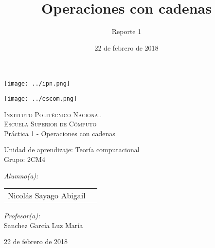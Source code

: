 \documentclass[12pt]{article}
\date{22 de febrero de 2018}
\title{Operaciones con cadenas}
\author{Reporte 1}
\begin{document}
		\begin{titlepage}
			\begin{center}
				
				
				\noindent
				\begin{minipage}{0.5\textwidth}
					\begin{flushleft} \large
						\texttt{[image: ../ipn.png]}
					\end{flushleft}
				\end{minipage}%
				\begin{minipage}{0.55\textwidth}
					\begin{flushright} \large
						\texttt{[image: ../escom.png]}
					\end{flushright}
				\end{minipage}
				
				\textsc{\LARGE Instituto Politécnico Nacional}\\[0.5cm]
				
				\textsc{\Large Escuela Superior de Cómputo}\\[1cm]
				
				
				{ \huge Práctica 1 - Operaciones con cadenas \\[1cm] }
				
				{ \Large Unidad de aprendizaje: Teoría computacional} \\[1cm]
				
				{ \Large Grupo: 2CM4 } \\[1cm]
				
				\noindent
				\begin{minipage}{0.5\textwidth}
					\begin{flushleft} \large
						\emph{Alumno(a):}\\
						
						\begin{tabular}{ll}
					     Nicolás Sayago Abigail\\
					\end{tabular}
					\end{flushleft}
				\end{minipage}%
				\begin{minipage}{0.5\textwidth}
					\begin{flushright} \large
						\emph{Profesor(a):} \\
						Sanchez García Luz María  \\
					\end{flushright}
				\end{minipage}
				
				\vfill
				
				{\large 22 de febrero de 2018}
			\end{center}
		\end{titlepage}
	
\end{document}
